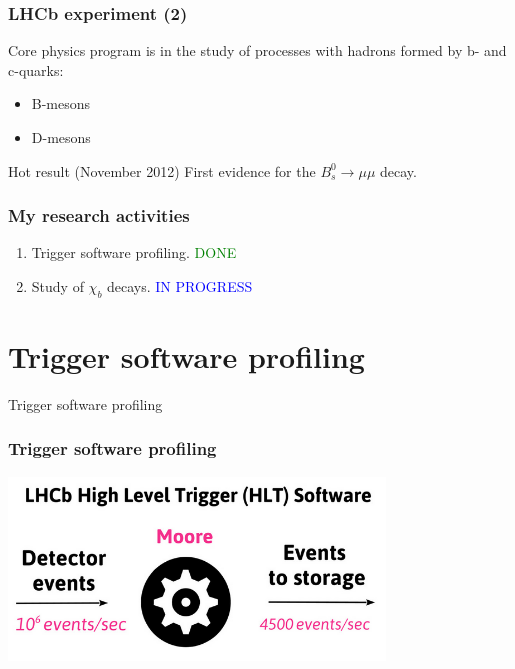 \documentclass{beamer}
\begin{document}
\begin{frame}
\frametitle{LHCb experiment (2)}
Core physics program is in the study of processes with hadrons formed by b-
and c-quarks:
\begin{itemize}
    \item B-mesons
    \item D-mesons
\end{itemize}

\begin{alertblock}{Hot result (November 2012)}
First evidence for the $B^{0}_{s} \rightarrow \mu \mu$ decay.
\end{alertblock}
\end{frame}
\begin{frame}
\frametitle{My research activities}
\begin{enumerate}
    \item Trigger software profiling. \textcolor{green}{DONE}
    \item Study of $\chi_{b}$ decays. \textcolor{blue}{IN PROGRESS}
\end{enumerate}
\end{frame}
\section{Trigger software profiling}
\begin{frame}
\begin{exampleblock}{}
  \begin{center}
    {\huge Trigger software profiling}
  \end{center}
\end{exampleblock}

\end{frame}

\begin{frame}
\frametitle{Trigger software profiling}
\includegraphics[width=100mm]{images/moore.png}
\end{frame}
\end{document}
